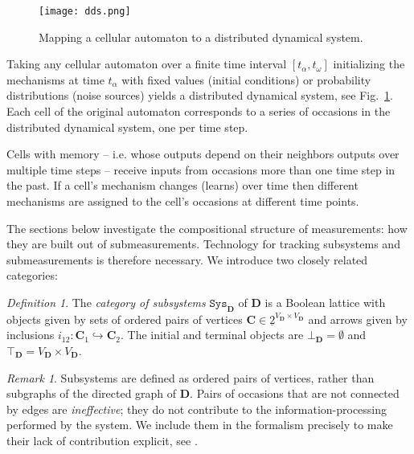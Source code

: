 \documentclass[12pt]{article}
\newcommand{\univ}{{\mathbf D}}
\newcommand{\mangle}{{\mathbf C}}
\newcommand{\subs}{{\mathtt{Sys}}}
\theoremstyle{remark}
\newtheorem{rem}{Remark}
\newtheorem{defn}{Definition}
\begin{document}
\begin{figure}
	\centering
	\texttt{[image: dds.png]}
	\caption{Mapping a cellular automaton to a distributed 
    dynamical system.
	}
	\label{f:dds}
\end{figure}

Taking any cellular automaton over a finite time interval 
$[t_\alpha,t_\omega]$ initializing the mechanisms at time 
$t_\alpha$ with fixed values (initial conditions) or 
probability distributions (noise sources) yields a distributed 
dynamical system, see Fig.~\ref{f:dds}. Each cell of the 
original automaton corresponds to a series of occasions in 
the distributed dynamical system, one per time step.

Cells with memory -- i.e. whose outputs depend on their 
neighbors outputs over multiple time steps -- receive inputs 
from occasions more than one time step in the past. If a cell's 
mechanism changes (learns) over time then different mechanisms 
are assigned to the cell's occasions at different time points.

The sections below investigate the compositional structure of 
measurements: how they are built out of submeasurements. 
Technology for tracking subsystems and submeasurements is 
therefore necessary. We introduce two closely related 
categories:

\begin{defn}
    The \emph{category of subsystems} $\subs_\univ$ of $\univ$ 
    is a Boolean lattice with objects given by sets of ordered 
    pairs of vertices $\mangle\in\underline{2}^{V_\univ\times 
    V_\univ}$ and arrows given by inclusions $i_{12}:\mangle_1
    \hookrightarrow \mangle_2$. The initial and terminal 
    objects are $\bot_\univ=\emptyset$ and $\top_\univ=
    V_\univ\times V_\univ$.
\end{defn}

\begin{rem}
	\label{r:subsystems}
	Subsystems are defined as ordered pairs of vertices, 
    rather than subgraphs of the directed graph of $\univ$. 
    Pairs of occasions that are not connected by edges are 
    \emph{ineffective}; they do not contribute to the 
    information-processing performed by the system. We include 
    them in the formalism precisely to make their lack of 
    contribution explicit, see %
    .
\end{rem}
\end{document}

